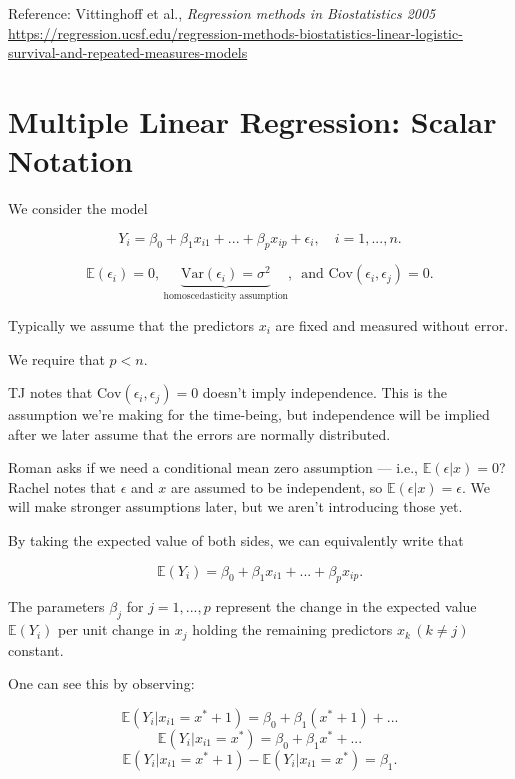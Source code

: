 \documentclass[
  letterpaper,
  DIV=11,
  numbers=noendperiod]{scrreport}
\begin{document}
Reference: Vittinghoff et al., \emph{Regression methods in Biostatistics
2005}
\url{https://regression.ucsf.edu/regression-methods-biostatistics-linear-logistic-survival-and-repeated-measures-models}

\hypertarget{multiple-linear-regression-scalar-notation}{%
\section{Multiple Linear Regression: Scalar
Notation}\label{multiple-linear-regression-scalar-notation}}

We consider the model

\[Y_i = \beta_0 + \beta_1 x_{i1} + ... + \beta_p x_{ip} + \epsilon_i, \quad i = 1, ..., n.\]

\[\mathbb E(\epsilon_i) = 0, \, \underbrace{\text{Var}(\epsilon_i) = \sigma^2}_{\text{homoscedasticity assumption}}, \, \text{ and Cov}(\epsilon_i, \epsilon_j) = 0.\]

Typically we assume that the predictors \(x_i\) are fixed and measured
without error.

We require that \(p < n\).

TJ notes that \(\text{Cov}(\epsilon_i, \epsilon_j) = 0\) doesn't imply
independence. This is the assumption we're making for the time-being,
but independence will be implied after we later assume that the errors
are normally distributed.

Roman asks if we need a conditional mean zero assumption --- i.e.,
\(\mathbb E(\epsilon | x) = 0\)? Rachel notes that \(\epsilon\) and
\(x\) are assumed to be independent, so
\(\mathbb E(\epsilon | x) = \epsilon\). We will make stronger
assumptions later, but we aren't introducing those yet.

By taking the expected value of both sides, we can equivalently write
that

\[\mathbb E(Y_i) = \beta_0 + \beta_1 x_{i1} + ... + \beta_p x_{ip}.\]

The parameters \(\beta_j\) for \(j = 1, ..., p\) represent the change in
the expected value \(\mathbb E(Y_i)\) per unit change in \(x_j\) holding
the remaining predictors \(x_k \, (k \neq j)\) constant.

One can see this by observing:

\[ \mathbb E(Y_i | x_{i1} = x^* + 1) = \beta_0 + \beta_1 (x^* + 1) + ...\]
\[ \mathbb E(Y_i | x_{i1} = x^*) = \beta_0 + \beta_1 x^* + ...\]
\[ \mathbb E(Y_i | x_{i1} = x^* + 1) - \mathbb E(Y_i | x_{i1} = x^*) = \beta_1.\]
\end{document}
